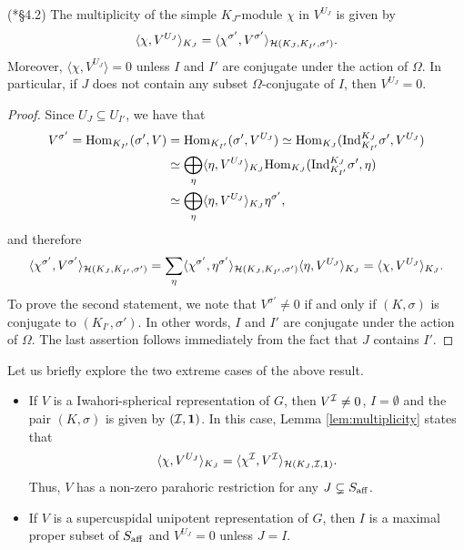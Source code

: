 \begin{lemma}\label{lem:multiplicity} (\cite{Reeder2000}*{\S 4.2})
    The multiplicity of the simple $K_J$-module $\chi$ in $V^{U_J}$ is given by 
    $$\langle\chi,V^{U_J}\rangle_{K_J}=\langle\chi^{\sigma'},V^{\sigma'}\rangle_{\mathcal{H}(K_J,K_{I'},\sigma')}.$$
    Moreover, $\langle\chi,V^{U_J}\rangle=0$ unless $I$ and $I'$ are conjugate under the action of $\Omega$. In particular, if $J$ does not contain any subset $\Omega$-conjugate of $I$, then $V^{U_J}=0$.
\end{lemma}
\begin{proof}
    Since $U_J\subseteq U_{I'}$, we have that
    \begin{align*}
        V^{\sigma'}=\mathrm{Hom}_{K_{I'}}(\sigma',V)&=\mathrm{Hom}_{K_{I'}}(\sigma',V^{U_J})\simeq\mathrm{Hom}_{K_J}(\mathrm{Ind}_{K_{I'}}^{K_J}\sigma',V^{U_J})\\
        &\simeq\bigoplus_\eta\langle\eta,V^{U_J}\rangle_{K_J}\mathrm{Hom}_{K_J}(\mathrm{Ind}_{K_{I'}}^{K_J}\sigma',\eta)\\
        &\simeq\bigoplus_\eta\langle\eta,V^{U_J}\rangle_{K_J}\eta^{\sigma'},
    \end{align*}
    and therefore
    \begin{equation*}
        \langle\chi^{\sigma'},V^{\sigma'}\rangle_{\mathcal{H}(K_J,K_{I'},\sigma')}=\sum_\eta\langle\chi^{\sigma'},\eta^{\sigma'}\rangle_{\mathcal{H}(K_J,K_{I'},\sigma')}\langle\eta,V^{U_J}\rangle_{K_J}=\langle\chi,V^{U_J}\rangle_{K_J}.
    \end{equation*}
    To prove the second statement, we note that $V^{\sigma'}\neq0$ if and only if $(K,\sigma)$ is conjugate to $(K_{I'},\sigma')$. In other words, $I$ and $I'$ are conjugate under the action of $\Omega$. The last assertion follows immediately from the fact that $J$ contains $I'$.
\end{proof}

\begin{example}
    Let us briefly explore the two extreme cases of the above result.
    \begin{itemize}
        \item If $V$ is a Iwahori-spherical representation of $G$, then $V^{\mathcal{I}}\neq 0$, $I=\emptyset$ and the pair $(K,\sigma)$ is given by $(\mathcal{I},\mathbf{1})$. In this case, Lemma \ref{lem:multiplicity} states that 
        $$\langle\chi,V^{U_J}\rangle_{K_J}=\langle\chi^{\mathcal{I}},V^{\mathcal{I}}\rangle_{\mathcal{H}(K_J,\mathcal{I},\mathbf{1})}.$$
        Thus, $V$ has a non-zero parahoric restriction for any $J\subsetneq S_{\mathrm{aff}}$.
        \item If $V$ is a supercuspidal unipotent representation of $G$, then $I$ is a maximal proper subset of $S_{\mathrm{aff}}$ and $V^{U_J}=0$ unless $J=I$.
    \end{itemize}
\end{example}

